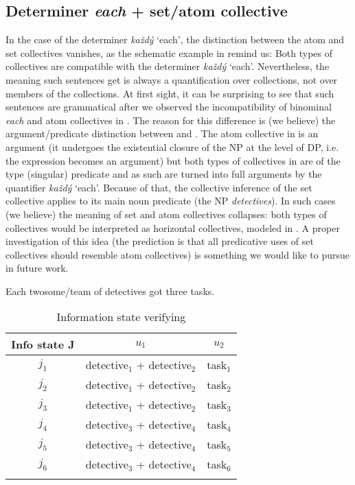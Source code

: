 \documentclass[output=paper,colorlinks,citecolor=brown,newtxmath]{langscibook}
\begin{document}
\subsection{Determiner \textit{each} + set/atom
collective}\label{determiner-each-setatom-collective}

In the case of the determiner \textit{každý} `each', the distinction between the atom and set collectives vanishes, as the schematic example in  remind us: Both types of collectives are compatible with the determiner \textit{každý} `each'. Nevertheless, the meaning such sentences get is always a quantification over collections, not over members of the collections. At first sight, it can be surprising to see that such sentences are grammatical after we observed the incompatibility of binominal \textit{each} and atom collectives in . The reason for this difference is (we believe) the argument/predicate distinction between  and . The atom collective in  is an argument (it undergoes the existential closure of the NP at the level of DP, i.e. the expression becomes an argument) but both types of collectives in  are of the type (singular) predicate and as such are turned into full arguments by the quantifier \textit{každý} `each'. Because of that, the collective inference of the set collective applies to its main noun predicate (the NP \textit{detectives}). In such cases (we believe) the meaning of set and atom collectives collapses: both types of collectives would be interpreted as horizontal collectives, modeled in . A proper investigation of this idea (the prediction is that all predicative uses of set collectives should resemble atom collectives) is something we would like to pursue in future work.

\ea\label{ex:sec-det-each-set-atom-coll} Each twosome/team of detectives got three tasks.
\z

\begin{table}
\centering
\begin{tabularx}{0.6\textwidth}{ccc}
\lsptoprule
Info state J & \(u_1\) & \(u_2\)\tabularnewline
\midrule
\(j_1\) & detective\(_1\) + detective\(_2\) & task\(_1\)\tabularnewline
\(j_2\) & detective\(_1\) + detective\(_2\) & task\(_2\)\tabularnewline
\(j_3\) & detective\(_1\) + detective\(_2\) & task\(_3\)\tabularnewline
\(j_4\) & detective\(_3\) + detective\(_4\) & task\(_4\)\tabularnewline
\(j_5\) & detective\(_3\) + detective\(_4\) & task\(_5\)\tabularnewline
\(j_6\) & detective\(_3\) + detective\(_4\) & task\(_6\)\tabularnewline
\lspbottomrule
\end{tabularx}
\caption{Information state verifying }
\label{table7}
\end{table}
\end{document}
